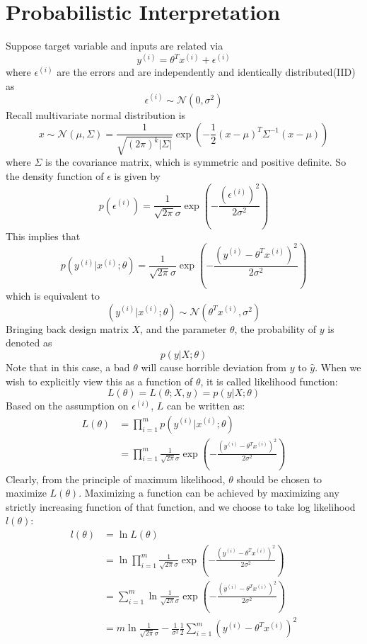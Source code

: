 \documentclass[10pt,a4paper,oneside]{article}
\begin{document}
\section{Probabilistic Interpretation}
Suppose target variable and inputs are related via
\[
y^{(i)} = \theta^T x^{(i)} + \epsilon^{(i)}
\] 
where $\epsilon^{(i)}$ are the errors and are independently and identically distributed(IID) as
\[
\epsilon^{(i)} \sim \mathcal{N}(0, \sigma^2)
\]
Recall multivariate normal distribution is
\[
x \sim \mathcal{N} (\mu, \Sigma)= \frac{1}{\sqrt{(2\pi)^k|\Sigma|}} \exp \left( -\frac{1}{2}(x-\mu)^T \Sigma ^{-1} (x-\mu)\right)
\]
where $\Sigma$ is the covariance matrix, which is symmetric and positive definite. So the density function of $\epsilon$ is given by
\[
p(\epsilon^{(i)}) = \frac{1}{\sqrt{2\pi} \sigma} \exp \left(-\frac{(\epsilon^{(i)})^2}{2\sigma^2} \right)
\]
This implies that
\[
p(y^{(i)}|x^{(i)}; \theta) = \frac{1}{\sqrt{2\pi} \sigma} \exp \left(-\frac{( y^{(i)} - \theta^T x^{(i)})^2}{2\sigma^2} \right)
\]
which is equivalent to
\[
\left( y^{(i)} | x^{(i)}; \theta \right) \sim \mathcal{N}(\theta^Tx^{(i)}, \sigma^2)
\]
Bringing back design matrix $X$, and the parameter $\theta$, the probability of $y$ is denoted as
\[
p(y | X; \theta)
\]
Note that in this case, a bad $\theta$ will cause horrible deviation from $y$ to $\hat{y}$. When we wish to explicitly view this as a function of $\theta$, it is called likelihood function:
\[
L(\theta) = L(\theta; X, y) = p(y | X; \theta)
\]
Based on the assumption on $\epsilon^{(i)}$, $L$ can be written as:
\begin{align*}
L(\theta) &= \prod_{i=1}^{m}  p(y^{(i)} | x^{(i)}; \theta)\\
&= \prod_{i=1}^{m}   \frac{1}{\sqrt{2\pi} \sigma} \exp \left(-\frac{( y^{(i)} - \theta^T x^{(i)})^2}{2\sigma^2} \right)
\end{align*}
Clearly, from the principle of maximum likelihood, $\theta$ should be chosen to maximize $L(\theta)$. Maximizing a function can be achieved by maximizing any strictly increasing function of that function, and we choose to take log likelihood $l(\theta)$:
\begin{align*}
l(\theta) &= \ln L(\theta)\\
&= \ln \prod_{i=1}^{m}   \frac{1}{\sqrt{2\pi} \sigma} \exp \left(-\frac{( y^{(i)} - \theta^T x^{(i)})^2}{2\sigma^2} \right)\\
&= \sum_{i=1}^{m} \ln  \frac{1}{\sqrt{2\pi} \sigma} \exp \left(-\frac{( y^{(i)} - \theta^T x^{(i)})^2}{2\sigma^2} \right)\\
&= m \ln \frac{1}{\sqrt{2\pi} \sigma} - \frac{1}{\sigma^2} \frac{1}{2} \sum_{i=1}^{m} ( y^{(i)} - \theta^T x^{(i)})^2
\end{align*}
\end{document}

